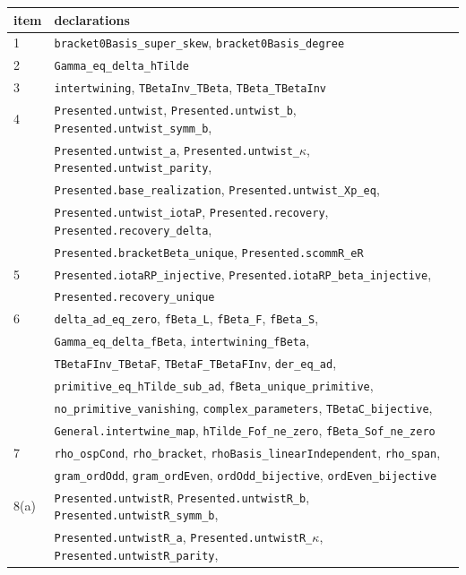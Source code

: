 \documentclass[11pt]{article}
\numberwithin{equation}{section}
\theoremstyle{definition}
\theoremstyle{remark}
\begin{document}
{\small
\begin{longtable}{ll}
item & declarations\\\hline
\endhead
1 & \texttt{bracket0Basis\_super\_skew}, \texttt{bracket0Basis\_degree}\\
2 & \texttt{Gamma\_eq\_delta\_hTilde}\\
3 & \texttt{intertwining}, \texttt{TBetaInv\_TBeta}, \texttt{TBeta\_TBetaInv}\\
4 & \texttt{Presented.untwist}, \texttt{Presented.untwist\_b}, \texttt{Presented.untwist\_symm\_b},\\
  & \texttt{Presented.untwist\_a}, \texttt{Presented.untwist\_}$\kappa$, \texttt{Presented.untwist\_parity},\\
  & \texttt{Presented.base\_realization}, \texttt{Presented.untwist\_Xp\_eq},\\
  & \texttt{Presented.untwist\_iotaP}, \texttt{Presented.recovery}, \texttt{Presented.recovery\_delta},\\
  & \texttt{Presented.bracketBeta\_unique}, \texttt{Presented.scommR\_eR}\\
5 & \texttt{Presented.iotaRP\_injective}, \texttt{Presented.iotaRP\_beta\_injective},\\
  & \texttt{Presented.recovery\_unique}\\
6 & \texttt{delta\_ad\_eq\_zero}, \texttt{fBeta\_L}, \texttt{fBeta\_F}, \texttt{fBeta\_S},\\
  & \texttt{Gamma\_eq\_delta\_fBeta}, \texttt{intertwining\_fBeta},\\
  & \texttt{TBetaFInv\_TBetaF}, \texttt{TBetaF\_TBetaFInv}, \texttt{der\_eq\_ad},\\
  & \texttt{primitive\_eq\_hTilde\_sub\_ad}, \texttt{fBeta\_unique\_primitive},\\
  & \texttt{no\_primitive\_vanishing}, \texttt{complex\_parameters}, \texttt{TBetaC\_bijective},\\
  & \texttt{General.intertwine\_map}, \texttt{hTilde\_Fof\_ne\_zero}, \texttt{fBeta\_Sof\_ne\_zero}\\
7 & \texttt{rho\_ospCond}, \texttt{rho\_bracket},
    \texttt{rhoBasis\_linearIndependent}, \texttt{rho\_span},\\
  & \texttt{gram\_ordOdd}, \texttt{gram\_ordEven}, \texttt{ordOdd\_bijective},
    \texttt{ordEven\_bijective}\\
8(a) & \texttt{Presented.untwistR}, \texttt{Presented.untwistR\_b}, \texttt{Presented.untwistR\_symm\_b},\\
  & \texttt{Presented.untwistR\_a}, \texttt{Presented.untwistR\_}$\kappa$, \texttt{Presented.untwistR\_parity},\\

\end{longtable}}
\end{document}
